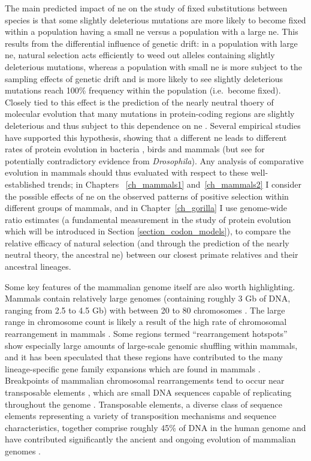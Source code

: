 The main predicted impact of \ac{ne} on the study of fixed
substitutions between species is that some slightly deleterious
mutations are more likely to become fixed within a population having a
small \ac{ne} versus a population with a large \ac{ne}. This results
from the differential influence of genetic drift: in a population with
large \ac{ne}, natural selection acts efficiently to weed out alleles
containing slightly deleterious mutations, whereas a population with
small \ac{ne} is more subject to the sampling effects of genetic drift
and is more likely to see slightly deleterious mutations reach 100\%
frequency within the population (i.e.\, become fixed). Closely tied to
this effect is the prediction of the nearly neutral thoery of
molecular evolution \citep{Kimura1985} that many mutations in
protein-coding regions are slightly deleterious and thus subject to
this dependence on \ac{ne}
\citep{Kimura1974,Kimura1985,Ohta1992}. Several empirical studies have
supported this hypothesis, showing that a different \ac{ne} leads to
different rates of protein evolution in bacteria
\citep{Moran2008,Warnecke2011}, birds \citep{Axelsson2009} and mammals
\citep{Kosiol2008,Ellegren2009} (but see \citet{Bachtrog2008} for
potentially contradictory evidence from \emph{Drosophila}). Any
analysis of comparative evolution in mammals should thus evaluated
with respect to these well-established trends; in Chapters~
\ref{ch_mammals1} and~\ref{ch_mammals2} I consider the possible
effects of \ac{ne} on the observed patterns of positive selection
within different groups of mammals, and in Chapter~\ref{ch_gorilla} I
use genome-wide \dnds ratio estimates (a fundamental measurement in
the study of protein evolution which will be introduced in Section
\ref{section_codon_models}), to compare the relative efficacy of
natural selection (and through the prediction of the nearly neutral
theory, the ancestral \ac{ne}) between our closest primate relatives
and their ancestral lineages.

Some key features of the mammalian genome itself are also worth
highlighting. Mammals contain relatively large genomes (containing
roughly 3 Gb of DNA, ranging from 2.5 to 4.5 Gb) with between 20 to 80
chromosomes \citep{Bachmann1972}. The large range in chromosome count
is likely a result of the high rate of chromosomal rearrangement in
mammals \citep{Eichler2003,Pevzner2003}. Some regions termed
``rearrangement hotspots'' show especially large amounts of
large-scale genomic shuffling within mammals, and it has been
speculated that these regions have contributed to the many
lineage-specific gene family expansions which are found in mammals
\citep{Eichler2003}. Breakpoints of mammalian chromosomal
rearrangements tend to occur near transposable elements
\citep{Zhao2009}, which are small DNA sequences capable of replicating
throughout the genome \citep{Lander2001}. Transposable elements, a
diverse class of sequence elements representing a variety of
transposition mechanisms and sequence characteristics, together
comprise roughly 45\% of DNA in the human genome and have contributed
significantly the ancient and ongoing evolution of mammalian genomes
\citep{Lander2001,Cordaux2009}.


